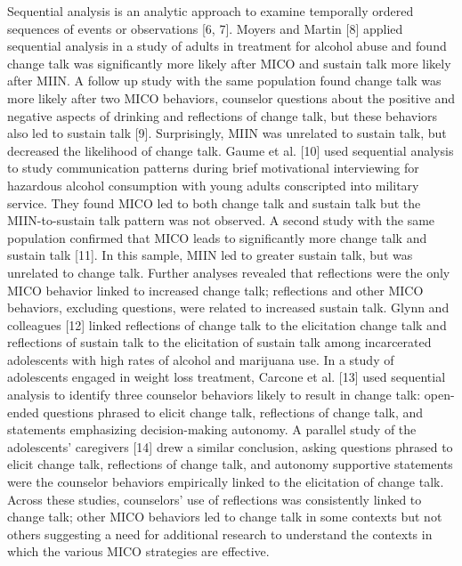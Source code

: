 Sequential analysis is an analytic approach to examine temporally ordered sequences of events or observations [6, 7]. Moyers and Martin [8] applied sequential analysis in a study of adults in treatment for alcohol abuse and found change talk was significantly more likely after MICO and sustain talk more likely after MIIN. A follow up study with the same population found change talk was more likely after two MICO behaviors, counselor questions about the positive and negative aspects of drinking and reflections of change talk, but these behaviors also led to sustain talk [9]. Surprisingly, MIIN was unrelated to sustain talk, but decreased the likelihood of change talk. Gaume et al. [10] used sequential analysis to study communication patterns during brief motivational interviewing for hazardous alcohol consumption with young adults conscripted into military service. They found MICO led to both change talk and sustain talk but the MIIN-to-sustain talk pattern was not observed. A second study with the same population confirmed that MICO leads to significantly more change talk and sustain talk [11]. In this sample, MIIN led to greater sustain talk, but was unrelated to change talk. Further analyses revealed that reflections were the only MICO behavior linked to increased change talk; reflections and other MICO behaviors, excluding questions, were related to increased sustain talk. Glynn and colleagues [12] linked reflections of change talk to the elicitation change talk and reflections of sustain talk to the elicitation of sustain talk among incarcerated adolescents with high rates of alcohol and marijuana use. In a study of adolescents engaged in weight loss treatment, Carcone et al. [13] used sequential analysis to identify three counselor behaviors likely to result in change talk: open-ended questions phrased to elicit change talk, reflections of change talk, and statements emphasizing decision-making autonomy. A parallel study of the adolescents’ caregivers [14] drew a similar conclusion, asking questions phrased to elicit change talk, reflections of change talk, and autonomy supportive statements were the counselor behaviors empirically linked to the elicitation of change talk. Across these studies, counselors’ use of reflections was consistently linked to change talk; other MICO behaviors led to change talk in some contexts but not others suggesting a need for additional research to understand the contexts in which the various MICO strategies are effective. 

